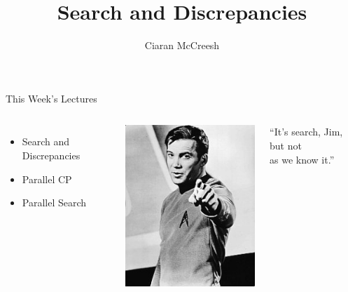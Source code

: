 \documentclass{beamer}
\title{Search and Discrepancies}
\author[Ciaran McCreesh]{\textcolor{uofgblue}{Ciaran McCreesh}}
\begin{document}
{
    \begin{frame}[plain]
        \titlepage
    \end{frame}
}

\begin{frame}{This Week's Lectures}
    \begin{columns}
        \begin{itemize}
            \item Search and Discrepancies
            \item Parallel CP
            \item Parallel Search
        \end{itemize}
        \centering\includegraphics*[keepaspectratio=true,scale=0.5]{images/search-but-not-as-we-know-it.jpg}
        \begin{center}``It's search, Jim, but not\\as we know it.''\end{center}
    \end{columns}
\end{frame}
\end{document}
